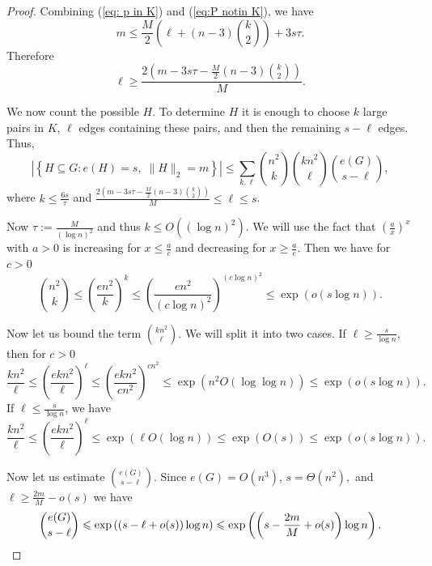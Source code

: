 \documentclass[reqno,11pt]{amsart}
\renewcommand{\leq}{\leqslant}
\renewcommand{\geq}{\geqslant}
\begin{document}
\begin{proof}
Combining (\ref{eq: p in K}) and (\ref{eq:P notin K}), we have 
$$
m
\leq
\frac{M}{2}\left( \ell+(n-3)\binom{k}{2} \right)+3s\tau.
$$
Therefore
\begin{equation} \label{eq: l > 2m/M}
\ell \geq \frac{2\left(m-3s\tau-\frac{M}{2}(n-3)\binom{k}{2}\right)}{M}. 
\end{equation}

We now count the possible \(H\). To determine $H$ it is enough to choose $k$ large pairs in $K$, $\ell$ edges containing these pairs, and then the remaining $s-\ell$ edges. Thus,
$$|\left\{
H\subseteq G:
e(H)=s,\;
\|H\|_2=m
\right\} | \leq \sum_{k,\ell} \binom{n^2}{k} \binom{kn^2}{\ell} \binom{e(G)}{s-\ell},$$
where $k \leq \frac{6s}{\tau}$ and $ \frac{2\left(m-3s\tau-\frac{M}{2}(n-3)\binom{k}{2}\right)}{M}\leq \ell \leq s$.

Now $\tau:=\frac{M}{(\log n)^2}$ and thus $k \leq O((\log n)^2)$. We will use the fact that $(\frac{a}{x})^x$ with $a >0$ is increasing for $x \leq \frac{a}{e}$ and decreasing for $x \geq \frac{a}{e}$. Then we have for $c>0$
$$\binom{n^2}{k} \leq \left(\frac{en^2}{k}\right)^k \leq \left(\frac{en^2}{(c\log n)^2}\right)^{(c\log n)^2} \leq \exp (o(s\log n)).$$

Now let us bound the term $\binom{kn^2}{\ell}$. We will split it into two cases. If $\ell \geq \frac{s}{\log n}$, then for $c>0$
$$\frac{kn^2}{\ell} \leq \left(\frac{ekn^2}{\ell}\right)^{\ell} \leq\left( \frac{ekn^2}{cn^2} \right)^{cn^2}\leq \exp (n^2 O(\log \log n)) \leq \exp(o(s \log n)).$$
If $\ell \leq \frac{s}{\log n}$, we have 
$$\frac{kn^2}{\ell} \leq \left(\frac{ekn^2}{\ell}\right)^{\ell} \leq \exp (\ell O(\log n)) \leq \exp(O(s)) \leq \exp(o(s \log n)).$$

Now let us estimate $\binom{e(G)}{s-\ell}$. Since $e(G)=O(n^3)$, $s=\Theta(n^2),$ and $\ell \geq \frac{2m}{M}-o(s)$ we have 
$$
\binom{e(G)}{s-\ell} \leq \exp\left((s-\ell+o(s))\log n\right)
\leq \exp\left(\left(s-\frac{2m}{M}+o(s) \right) \log n\right). \qedhere
$$
\end{proof}
\end{document}
